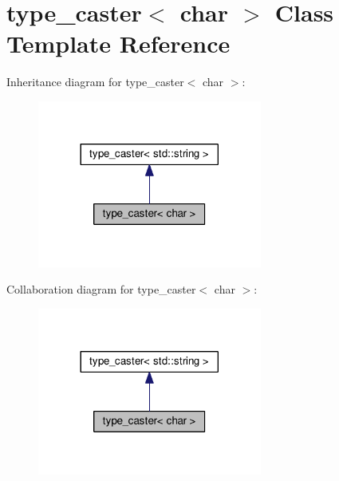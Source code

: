\hypertarget{classtype__caster_3_01char_01_4}{}\section{type\+\_\+caster$<$ char $>$ Class Template Reference}
\label{classtype__caster_3_01char_01_4}


Inheritance diagram for type\+\_\+caster$<$ char $>$\+:
\nopagebreak
\begin{figure}[H]
\begin{center}
\leavevmode
\includegraphics[width=209pt]{classtype__caster_3_01char_01_4__inherit__graph}
\end{center}
\end{figure}


Collaboration diagram for type\+\_\+caster$<$ char $>$\+:
\nopagebreak
\begin{figure}[H]
\begin{center}
\leavevmode
\includegraphics[width=209pt]{classtype__caster_3_01char_01_4__coll__graph}
\end{center}
\end{figure}
